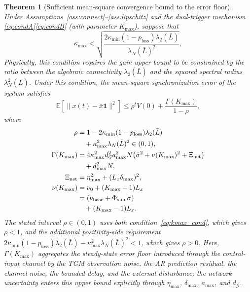 \documentclass[10pt]{article}
\newtheorem{theorem}{Theorem}[section]
\newcommand{\Lbar}{\bar{L}}
\newcommand{\kmax}{\kappa_{\max}}
\newcommand{\kmin}{\kappa_{\min}}
\newcommand{\ploss}{p_{\text{loss}}}
\newcommand{\lN}{\lambda_N(\Lbar)}
\newcommand{\ltwo}{\lambda_2(\Lbar)}
\newcommand{\sbar}{\bar{\sigma}}
\newcommand{\nubase}{\nu_{\text{base}}}
\newcommand{\Psum}{\Phi_{\text{sum}}}
\newcommand{\dmax}{d_{\max}}
\newcommand{\amax}{a_{\max}}
\newcommand{\gdeg}{d_{\mathcal{G}}}
\newcommand{\xinet}{\Xi_{\mathrm{net}}}
\begin{document}
\begin{theorem}[Sufficient mean-square convergence bound to the error floor]\label{thm:conv}
  Under Assumptions~\ref{ass:connect}--\ref{ass:lipschitz} and the dual-trigger mechanism \eqref{eq:condA}\eqref{eq:condB} (with parameter $K_{\max}$), suppose that
  \begin{equation}\label{eq:kmax_cond}
    \kmax < \sqrt{\frac{2\kmin(1-\ploss)\ltwo}{\lN^2}},
  \end{equation}
  Physically, this condition requires the gain upper bound to be constrained by the ratio between the algebraic connectivity $\lambda_2(\Lbar)$ and the squared spectral radius $\lambda_N^2(\Lbar)$.
  Under this condition, the mean-square synchronization error of the system satisfies
  \begin{equation}\label{eq:conv}
    \mathbb{E}[\|x(t)-\bar{x}\mathbf{1}\|^2] \leq \rho^t V(0) + \frac{\Gamma(K_{\max})}{1-\rho},
  \end{equation}
  where
  \begin{align}
    \rho &= 1 - 2\kmin(1-\ploss)\ltwo \notag\\
    &\quad {}+ \kmax^2\lN^2 \in(0,1),\label{eq:rho}\\
    \Gamma(K_{\max}) &= 4\kmax^2\gdeg^2\amax^2 N\bigl(\sbar^2+\nu(K_{\max})^2+\xinet\bigr)\notag\\
    &\quad {}+ \dmax^2 N,\label{eq:Gamma}\\
    \xinet &= \eta_{\max}^2 + (L_x\delta_{\max})^2,\label{eq:Xinet}\\
    \nu(K_{\max}) &= \nu_0+(K_{\max}-1)L_x\notag\\
    &= (\nubase+\Psum\sbar)\notag\\
    &\quad {}+(K_{\max}-1)L_x.\label{eq:nuKmax}
  \end{align}
  The stated interval $\rho\in(0,1)$ uses both condition~\eqref{eq:kmax_cond}, which gives $\rho<1$, and the additional positivity-side requirement $2\kmin(1-\ploss)\ltwo-\kmax^2\lN^2<1$, which gives $\rho>0$.
  Here, $\Gamma(K_{\max})$ aggregates the steady-state error floor introduced through the control-input channel by the TGM observation noise, the AR prediction residual, the channel noise, the bounded delay, and the external disturbance; the network uncertainty enters this upper bound explicitly through $\eta_{\max}$, $\delta_{\max}$, $\amax$, and $\gdeg$.
\end{theorem}
\end{document}
